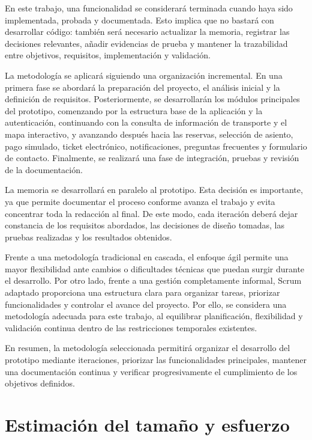 En este trabajo, una funcionalidad se considerará terminada cuando haya sido implementada, probada y documentada. Esto implica que no bastará con desarrollar código: también será necesario actualizar la memoria, registrar las decisiones relevantes, añadir evidencias de prueba y mantener la trazabilidad entre objetivos, requisitos, implementación y validación.

La metodología se aplicará siguiendo una organización incremental. En una primera fase se abordará la preparación del proyecto, el análisis inicial y la definición de requisitos. Posteriormente, se desarrollarán los módulos principales del prototipo, comenzando por la estructura base de la aplicación y la autenticación, continuando con la consulta de información de transporte y el mapa interactivo, y avanzando después hacia las reservas, selección de asiento, pago simulado, ticket electrónico, notificaciones, preguntas frecuentes y formulario de contacto. Finalmente, se realizará una fase de integración, pruebas y revisión de la documentación.

La memoria se desarrollará en paralelo al prototipo. Esta decisión es importante, ya que permite documentar el proceso conforme avanza el trabajo y evita concentrar toda la redacción al final. De este modo, cada iteración deberá dejar constancia de los requisitos abordados, las decisiones de diseño tomadas, las pruebas realizadas y los resultados obtenidos.

Frente a una metodología tradicional en cascada, el enfoque ágil permite una mayor flexibilidad ante cambios o dificultades técnicas que puedan surgir durante el desarrollo. Por otro lado, frente a una gestión completamente informal, Scrum adaptado proporciona una estructura clara para organizar tareas, priorizar funcionalidades y controlar el avance del proyecto. Por ello, se considera una metodología adecuada para este trabajo, al equilibrar planificación, flexibilidad y validación continua dentro de las restricciones temporales existentes.

En resumen, la metodología seleccionada permitirá organizar el desarrollo del prototipo mediante iteraciones, priorizar las funcionalidades principales, mantener una documentación continua y verificar progresivamente el cumplimiento de los objetivos definidos.


\section{Estimación del tamaño y esfuerzo}
\label{sec:estimacion}

